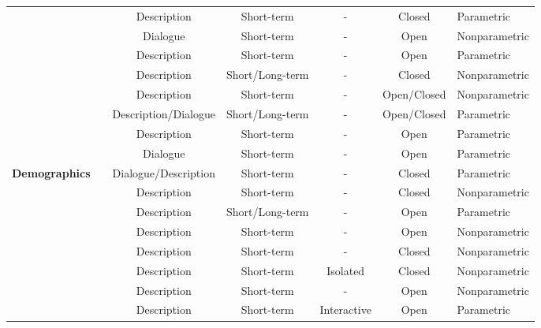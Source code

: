 \begin{table}[!htp]
\begin{tabularx}{\linewidth}{c|>{\centering\arraybackslash}X|c|c|c|c|>{\centering\arraybackslash}m{8em}}
		\cmidrule{2-7}
		& \cite{shen2024roleevalbilingualroleevaluation} & Description & Short-term & - & Closed  & Parametric  \\
		\cmidrule{2-7}
		& \cite{tu2024characterevalchinesebenchmarkroleplaying} & Dialogue & Short-term & - & Open  & Nonparametric  \\
		\cmidrule{2-7}
		& \cite{yu2024neekoleveragingdynamiclora} & Description & Short-term & - & Open  & Parametric  \\
		\cmidrule{2-7}
		& \cite{xu2024characterdestinylargelanguage} & Description & Short/Long-term & - & Closed  & Nonparametric  \\
		\cmidrule{2-7}
		& \cite{yuan2024evaluatingcharacterunderstandinglarge} & Description & Short-term & - & Open/Closed  & Nonparametric  \\
		\cmidrule{2-7}
		& \cite{ran2024capturingmindsjustwords} & Description/Dialogue & Short/Long-term & - & Open/Closed  & Parametric  \\
		\cmidrule{2-7}
		& \cite{dai2024mmrolecomprehensiveframeworkdeveloping} & Description & Short-term & - & Open  & Parametric  \\
		\cmidrule{2-7}
		& \cite{yu2024dialogueprofiledialoguealignmentframework} & Dialogue & Short-term & - & Open  & Parametric  \\
		\midrule
		 \multirow[m]{35}{6em}{\textbf{Demographics}}& \cite{karra2023estimatingpersonalitywhiteboxlanguage} & Dialogue/Description & Short-term & - & Closed  & Parametric  \\
		 \cmidrule{2-7}
		& \cite{jiang2023evaluatinginducingpersonalitypretrained} & Description & Short-term & - & Closed  & Nonparametric  \\
		\cmidrule{2-7}
		& \cite{Liu_2022} & Description & Short/Long-term & - & Open  & Parametric  \\
		\cmidrule{2-7}
		& \cite{Argyle_2023} & Description & Short-term & - & Open  & Nonparametric  \\
		\cmidrule{2-7}
		& \cite{horton2023largelanguagemodelssimulated} & Description & Short-term & - & Closed  & Nonparametric  \\
		\cmidrule{2-7}
		& \cite{xie2023wallstreetneophytezeroshot} & Description & Short-term & Isolated & Closed  & Nonparametric  \\
		\cmidrule{2-7}
		& \cite{deshpande2023toxicitychatgptanalyzingpersonaassigned} & Description & Short-term & - & Open  & Nonparametric  \\
		\cmidrule{2-7}
		& \cite{xiang2023languagemodelsmeetworld} & Description & Short-term & Interactive & Open  & Parametric  \\

\end{tabularx}
\end{table}
